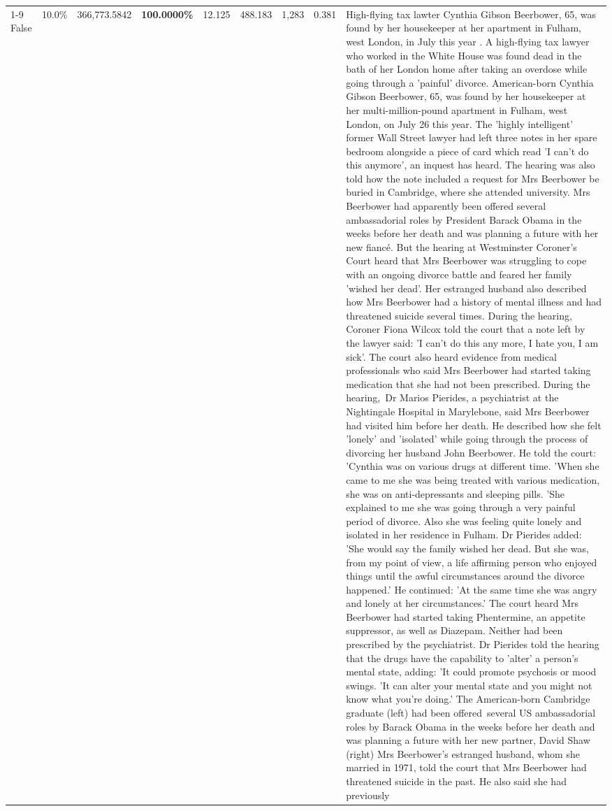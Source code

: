 \begin{table}[H]
\begin{tabular}{lllrlllll}
\cline{1-9}
False & 10.0\% & 366,773.5842 & \bfseries \color{red} 100.0000\% & 12.125 & 488.183 & 1,283 & 0.381 & High-flying tax lawter Cynthia Gibson Beerbower, 65, was found by her housekeeper at her apartment in Fulham, west London, in July this year . A high-flying tax lawyer who worked in the White House was found dead in the bath of her London home after taking an overdose while going through a 'painful' divorce. American-born Cynthia Gibson Beerbower, 65, was found by her housekeeper at her multi-million-pound apartment in Fulham, west London, on July 26 this year. The 'highly intelligent' former Wall Street lawyer had left three notes in her spare bedroom alongside a piece of card which read 'I can't do this anymore', an inquest has heard. The hearing was also told how the note included a request for Mrs Beerbower be buried in Cambridge, where she attended university. Mrs Beerbower had apparently been offered several ambassadorial roles by President Barack Obama in the weeks before her death and was planning a future with her new fiancé. But the hearing at Westminster Coroner's Court heard that Mrs Beerbower was struggling to cope with an ongoing divorce battle and feared her family 'wished her dead'. Her estranged husband also described how Mrs Beerbower had a history of mental illness and had threatened suicide several times. During the hearing, Coroner Fiona Wilcox told the court that a note left by the lawyer said: 'I can't do this any more, I hate you, I am sick'. The court also heard evidence from medical professionals who said Mrs Beerbower had started taking medication that she had not been prescribed. During the hearing, Dr Marios Pierides, a psychiatrist at the Nightingale Hospital in Marylebone, said Mrs Beerbower had visited him before her death. He described how she felt 'lonely' and 'isolated' while going through the process of divorcing her husband John Beerbower. He told the court: 'Cynthia was on various drugs at different time. 'When she came to me she was being treated with various medication, she was on anti-depressants and sleeping pills. 'She explained to me she was going through a very painful period of divorce. Also she was feeling quite lonely and isolated in her residence in Fulham. Dr Pierides added: 'She would say the family wished her dead. But she was, from my point of view, a life affirming person who enjoyed things until the awful circumstances around the divorce happened.' He continued: 'At the same time she was angry and lonely at her circumstances.' The court heard Mrs Beerbower had started taking Phentermine, an appetite suppressor, as well as Diazepam. Neither had been prescribed by the psychiatrist. Dr Pierides told the hearing that the drugs have the capability to 'alter' a person's mental state, adding: 'It could promote psychosis or mood swings. 'It can alter your mental state and you might not know what you're doing.' The American-born Cambridge graduate (left) had been offered several US ambassadorial roles by Barack Obama in the weeks before her death and was planning a future with her new partner, David Shaw (right) Mrs Beerbower's estranged husband, whom she married in 1971, told the court that Mrs Beerbower had threatened suicide in the past. He also said she had previously 
\end{tabular}
\end{table}

